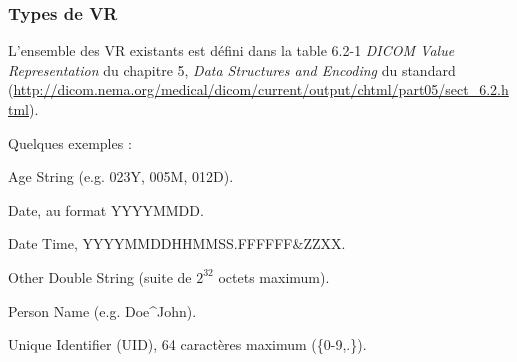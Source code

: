 \frame
{
    \frametitle{Types de VR}
    L'ensemble des VR existants est d\'efini dans la table 6.2-1 \emph{DICOM Value Representation} du chapitre 5, \emph{Data Structures and Encoding} du standard (\url{http://dicom.nema.org/medical/dicom/current/output/chtml/part05/sect_6.2.html}).
    
    Quelques exemples :
    \begin{description}
        \item<2->[AS] Age String (e.g. 023Y, 005M, 012D).
        \item<3->[DA] Date, au format YYYYMMDD.
        \item<4->[DT] Date Time, YYYYMMDDHHMMSS.FFFFFF\&{}ZZXX.
        \item<5->[OD] Other Double String (suite de $2^{32}$ octets maximum).
        \item<6->[PN] Person Name (e.g. Doe\^{}John).
        \item<7->[UI] Unique Identifier (UID), 64 caract\`eres maximum (\{0-9,.\}).
    \end{description}
}

